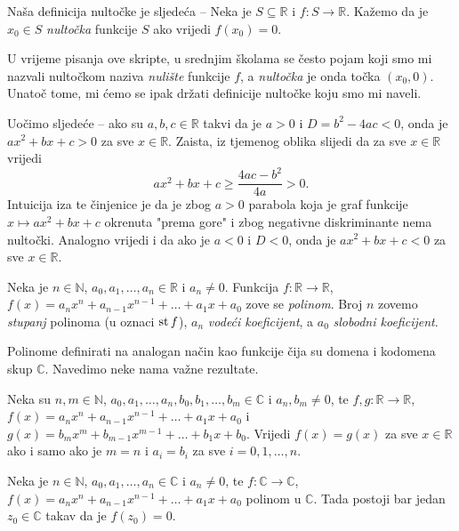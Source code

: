 \newpage
\begin{remark}
Naša definicija nultočke je sljedeća -- Neka je $S\subseteq \mathbb{R}$ i $f : S\to \mathbb{R}$. Kažemo da je $x_0\in S$ \textit{nultočka} funkcije $S$ ako vrijedi $f(x_0)=0$.

U vrijeme pisanja ove skripte, u srednjim školama se često pojam koji smo mi nazvali nultočkom naziva \textit{nulište} funkcije $f$, a \textit{nultočka} je onda točka $(x_0, 0)$. Unatoč tome, mi ćemo se ipak držati definicije nultočke koju smo mi naveli.
\end{remark}
\begin{remark}
\label{discrimrem}
Uočimo sljedeće -- ako su \(a, b, c\in \mathbb{R}\) takvi da je \(a>0\) i \(D=b^2-4ac<0\), onda je \(ax^2+bx+c>0\) za sve \(x\in \mathbb{R}\). Zaista, iz tjemenog oblika slijedi da za sve \(x\in \mathbb{R}\) vrijedi 
\[ax^2+bx+c\geq \dfrac{4ac-b^2}{4a}>0.\]
Intuicija iza te činjenice je da je zbog \(a>0\) parabola koja je graf funkcije \(x\mapsto ax^2+bx+c\) okrenuta "prema gore" i zbog negativne diskriminante nema nultočki. Analogno vrijedi i da ako je $a<0$ i $D<0$, onda je $ax^2+bx+c<0$ za sve $x\in \mathbb{R}$.
\end{remark}
\begin{definition}
Neka je $n\in \mathbb{N}$, $a_0, a_1, \dots, a_n\in \mathbb{R}$ i $a_n\neq 0$. Funkcija $f : \mathbb{R}\to \mathbb{R}$, $f(x)=a_nx^n+a_{n-1}x^{n-1}+\dots+a_1x+a_0$ zove se \textit{polinom}. Broj $n$ zovemo \textit{stupanj} polinoma (u oznaci $\operatorname{st}{f}$), $a_n$ \textit{vodeći koeficijent}, a $a_0$ \textit{slobodni koeficijent}.
\end{definition}
Polinome definirati na analogan način kao funkcije čija su domena i kodomena skup $\mathbb{C}$. Navedimo neke nama važne rezultate.
\begin{remark}
Neka su $n, m\in \mathbb{N}$, $a_0, a_1, \dots, a_n, b_0, b_1, \dots, b_m\in \mathbb{C}$ i $a_n, b_m\neq 0$, te $f, g : \mathbb{R}\to \mathbb{R}$, $f(x)=a_nx^n+a_{n-1}x^{n-1}+\dots+a_1x+a_0$ i $g(x)=b_mx^m+b_{m-1}x^{m-1}+\dots+b_1x+b_0$. Vrijedi $f(x)=g(x)$ za sve $x\in \mathbb{R}$ ako i samo ako je $m=n$ i $a_i=b_i$ za sve $i=0, 1, \dots, n$.
\end{remark}
\begin{remark}
Neka je $n\in \mathbb{N}$, $a_0, a_1, \dots, a_n\in \mathbb{C}$ i $a_n\neq 0$, te $f : \mathbb{C}\to \mathbb{C}$, $f(x)=a_nx^n+a_{n-1}x^{n-1}+\dots+a_1x+a_0$ polinom u $\mathbb{C}$. Tada postoji bar jedan $z_0\in \mathbb{C}$ takav da je $f(z_0)=0$.
\end{remark}
